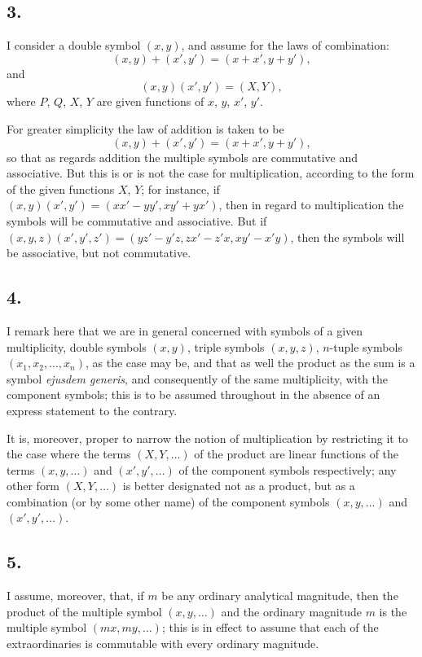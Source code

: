\documentclass[11pt,a4paper]{book}
\begin{document}
\subsection*{3.}

I consider a double symbol $(x, y)$, and assume for the laws of combination:
\[
(x, y) + (x', y') = (x + x', y + y'),
\]
and
\[
(x, y)(x', y') = (X, Y),
\]
where $P$, $Q$, $X$, $Y$ are given functions of $x$, $y$, $x'$, $y'$.

For greater simplicity the law of addition is taken to be
\[
(x, y) + (x', y') = (x + x', y + y'),
\]
so that as regards addition the multiple symbols are commutative and associative. But this is or is not the case for multiplication, according to the form of the given functions $X$, $Y$; for instance, if $(x, y)(x', y') = (xx' - yy', xy' + yx')$, then in regard to multiplication the symbols will be commutative and associative. But if $(x, y, z)(x', y', z') = (yz' - y'z, zx' - z'x, xy' - x'y)$, then the symbols will be associative, but not commutative.

\subsection*{4.}

I remark here that we are in general concerned with symbols of a given multiplicity, double symbols $(x, y)$, triple symbols $(x, y, z)$, $n$-tuple symbols $(x_1, x_2, \ldots, x_n)$, as the case may be, and that as well the product as the sum is a symbol \textit{ejusdem generis}, and consequently of the same multiplicity, with the component symbols; this is to be assumed throughout in the absence of an express statement to the contrary.

It is, moreover, proper to narrow the notion of multiplication by restricting it to the case where the terms $(X, Y, \ldots)$ of the product are linear functions of the terms $(x, y, \ldots)$ and $(x', y', \ldots)$ of the component symbols respectively; any other form $(X, Y, \ldots)$ is better designated not as a product, but as a combination (or by some other name) of the component symbols $(x, y, \ldots)$ and $(x', y', \ldots)$.

\subsection*{5.}

I assume, moreover, that, if $m$ be any ordinary analytical magnitude, then the product of the multiple symbol $(x, y, \ldots)$ and the ordinary magnitude $m$ is the multiple symbol $(mx, my, \ldots)$; this is in effect to assume that each of the extraordinaries is commutable with every ordinary magnitude.
\end{document}
